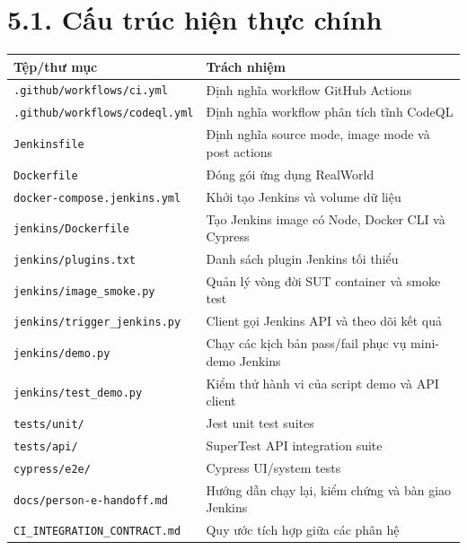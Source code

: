 \documentclass[
  vietnamese,
  12pt,
  a4paper,
  oneside]{report}
\begin{document}
\section{5.1. Cấu trúc hiện thực
chính}\label{51-cux1ea5u-truxfac-hiux1ec7n-thux1ef1c-chuxednh}

\begin{longtable}[]{@{}
  >{\raggedright\arraybackslash}p{}
  >{\raggedright\arraybackslash}p{}@{}}
\toprule\noalign{}
\begin{minipage}[b]{\linewidth}\raggedright
Tệp/thư mục
\end{minipage} & \begin{minipage}[b]{\linewidth}\raggedright
Trách nhiệm
\end{minipage} \\
\midrule\noalign{}
\endhead
\bottomrule\noalign{}
\endlastfoot
\texttt{.github/workflows/ci.yml} & Định nghĩa workflow GitHub
Actions \\
\texttt{.github/workflows/codeql.yml} & Định nghĩa workflow phân tích
tĩnh CodeQL \\
\texttt{Jenkinsfile} & Định nghĩa source mode, image mode và post
actions \\
\texttt{Dockerfile} & Đóng gói ứng dụng RealWorld \\
\texttt{docker-compose.jenkins.yml} & Khởi tạo Jenkins và volume dữ
liệu \\
\texttt{jenkins/Dockerfile} & Tạo Jenkins image có Node, Docker CLI và
Cypress \\
\texttt{jenkins/plugins.txt} & Danh sách plugin Jenkins tối thiểu \\
\texttt{jenkins/image\_smoke.py} & Quản lý vòng đời SUT container và
smoke test \\
\texttt{jenkins/trigger\_jenkins.py} & Client gọi Jenkins API và theo
dõi kết quả \\
\texttt{jenkins/demo.py} & Chạy các kịch bản pass/fail phục vụ mini-demo
Jenkins \\
\texttt{jenkins/test\_demo.py} & Kiểm thử hành vi của script demo và API
client \\
\texttt{tests/unit/} & Jest unit test suites \\
\texttt{tests/api/} & SuperTest API integration suite \\
\texttt{cypress/e2e/} & Cypress UI/system tests \\
\texttt{docs/person-e-handoff.md} & Hướng dẫn chạy lại, kiểm chứng và
bàn giao Jenkins \\
\texttt{CI\_INTEGRATION\_CONTRACT.md} & Quy ước tích hợp giữa các phân
hệ \\
\end{longtable}
\end{document}
